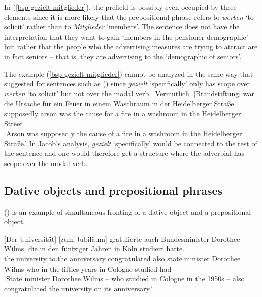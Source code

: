 In (\ref{bsp-gezielt-mitglieder}), the prefield is possibly even occupied by three elements since it is more likely that the
prepositional phrase refers to \emph{werben} `to solicit' rather than to \emph{Mitglieder} `members'. The sentence does not have the interpretation
that they want to gain `members in the pensioner demographic' but rather that the people who the advertising measures
are trying to attract are in fact seniors -- that is, they are advertising to the `demographic of seniors'.

The example (\ref{bsp-gezielt-mitglieder}) cannot be analyzed in the same way that \citet{Jacobs86a} suggested for
sentences such as () since \emph{gezielt} `specifically' only has scope over \emph{werben} `to solicit' but not over the modal verb.
\ea
\label{bsp-vermutlich}
\gll {}[Vermutlich] [Brandstiftung] war die Ursache für ein Feuer in einem Waschraum in der Heidelberger Straße.\footnotemark\\
	   \spacebr{}supposedly \spacebr{}arson was the cause for a fire in a washroom in the Heidelberger Street\\
\glt `Arson was supposedly the cause of a fire in a washroom in the Heidelberger Straße.'
\z
In Jacob's analysis, \emph{gezielt} `specifically' would be connected to the rest of the sentence
and one  would therefore get a structure where the adverbial has scope over the modal verb.



\subsection{Dative objects and prepositional phrases}

() is an example of simultaneous fronting of a dative object and a prepositional object.
\begin{sloppypar}
\ea{}
\gll {}[Der Universität] [zum Jubiläum] gratulierte auch Bundesminister Dorothee Wilms, die in den fünfziger Jahren in Köln studiert hatte.\footnotemark\\
	   \spacebr{}the university \spacebr{}to.the anniversary congratulated also state.minister Dorothee Wilms who in the fifties years in Cologne studied had\\
\glt `State minister Dorothee Wilms -- who studied in Cologne in the 1950s -- also congratulated the university on its anniversary.' 
\z
\end{sloppypar}


